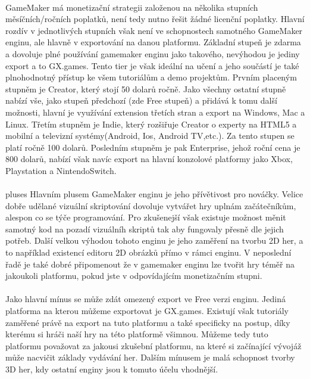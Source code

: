 \paragraph{}
	GameMaker má monetizační strategii\cite{gamemaker_tiers} založenou na několika stupních měsíčních/ročních poplatků, není tedy nutno řešit žádné licenční poplatky.
	Hlavní rozdív v jednotlivých stupních však není ve schopnostech samotného GameMaker enginu, ale hlavně v exportování na danou platformu.
	Základní stupeň je zdarma a dovoluje plné používání gamemaker enginu jako takového, nevýhodou je jediny export a to GX.games.
	Tento tier je však ideální na učení a jeho součástí je také plnohodnotný přístup ke všem tutoriálům a demo projektům.
	Prvním placeným stupněm je Creator, který stojí 50 dolarů ročně.
	Jako všechny ostatní stupně nabízí vše, jako stupeň předchozí (zde Free stupeň) a přidává k tomu další možnosti, hlavní je využívání extension třetích stran a export na Windows, Mac a Linux.
	Třetím stupněm je Indie, který rozšiřuje Creator o experty na HTML5 a mobilní a televizní systémy(Android, Ios, Android TV,etc.).
	Za tento stupen se platí ročně 100 dolarů.
	Posledním stupněm je pak Enterprise, jehož roční cena je 800 dolarů, nabízí však navíc export na hlavní konzolové platformy jako Xbox, Playstation a NintendoSwitch.


\paragraph{}
	pluses
	Hlavním plusem GameMaker enginu je jeho přívětivost pro nováčky.
	Velice dobře udělané vizuální skriptování dovoluje vytvářet hry uplnám začátečníkům, alespon co se týče programování.
	Pro zkušenejší však existuje možnost měnit samotný kod na pozadí vizuálníh skriptů tak aby fungovaly přesně dle jejich potřeb.
	Další velkou výhodou tohoto enginu je jeho zaměření na tvorbu 2D her, a to například existencí editoru 2D obrázků přímo v rámci enginu.
	V neposlední řadě je také dobré připomenout že v gamemaker enginu lze tvořit hry téměř na jakoukoli platformu, pokud jste v odpovídajícím monetizačním stupni.

\paragraph{}
	Jako hlavní mínus se může zdát omezený export ve Free verzi enginu.
	Jediná platforma na kterou můžeme exportovat je GX.games.
	Existují však tutoriály zaměřené právě na export na tuto platformu a také specificky na postup, díky kterému si hráči naší hry na této platformě všimnou.
	Můžeme tedy tuto platformu považovat za jakousi zkušební platformu, na které si začínající vývojáž může nacvičit základy vydávání her.
	Dalším mínusem je malá schopnost tvorby 3D her, kdy ostatní enginy jsou k tomuto účelu vhodnější.

